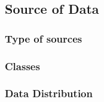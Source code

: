 \subsection{Source of Data}

\subsubsection{Type of sources} %

\subsubsection{Classes} %

\subsubsection{Data Distribution} %
